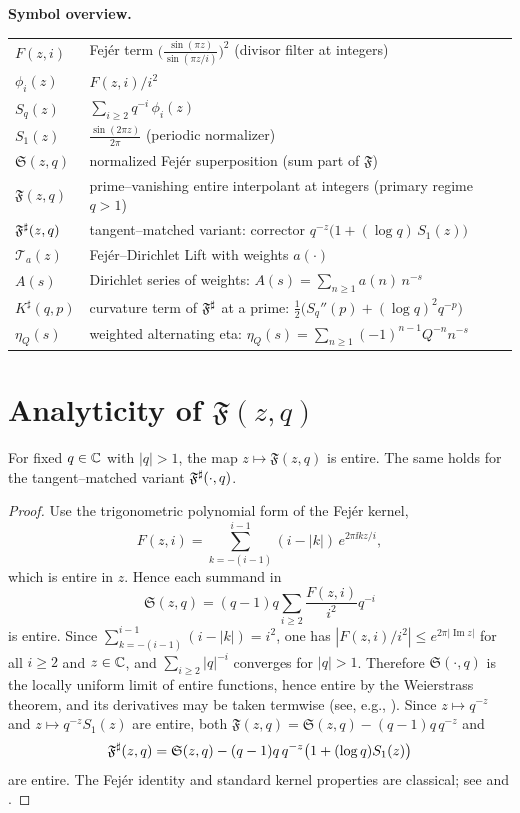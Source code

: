 \medskip
\noindent\textbf{Symbol overview.}\label{app:symbols}
\begin{center}
\begin{tabular}{@{}ll@{}}
$F(z,i)$ & Fej\'er term $\displaystyle \Big(\frac{\sin(\pi z)}{\sin(\pi z/i)}\Big)^{\!2}$ (divisor filter at integers) \\
$\phi_i(z)$ & $\displaystyle F(z,i)/i^2$ \\
$S_q(z)$ & $\displaystyle \sum_{i\ge2} q^{-i}\,\phi_i(z)$ \\
$S_1(z)$ & $\displaystyle \frac{\sin(2\pi z)}{2\pi}$ (periodic normalizer) \\
$\mathfrak S(z,q)$ & normalized Fej\'er superposition (sum part of $\mathfrak F$) \\
$\mathfrak F(z,q)$ & prime–vanishing entire interpolant at integers (primary regime $q>1$) \\
$\mathfrak F^{\sharp}(z,q)$ & tangent–matched variant: corrector $q^{-z}\bigl(1+(\log q)\,S_1(z)\bigr)$ \\
$\mathcal{T}_a(z)$ & Fej\'er–Dirichlet Lift with weights $a(\cdot)$ \\
$A(s)$ & Dirichlet series of weights: $\displaystyle A(s)=\sum_{n\ge1} a(n)\,n^{-s}$ \\
$K^\sharp(q,p)$ & curvature term of $\mathfrak F^{\sharp}$ at a prime: $\tfrac12\big(S_q''(p)+(\log q)^2q^{-p}\big)$ \\
$\eta_Q(s)$ & weighted alternating eta: $\displaystyle \eta_Q(s)=\sum_{n\ge1}(-1)^{n-1}Q^{-n}n^{-s}$ \\
\end{tabular}
\end{center}

\section{Analyticity of $\mathfrak F(z,q)$}\label{app:analyticity}

\begin{proposition}
For fixed $q\in\mathbb{C}$ with $|q|>1$, the map $z\mapsto\mathfrak F(z,q)$ is entire. The same holds for the tangent–matched variant $\mathfrak F^{\sharp}(\cdot,q)$.
\end{proposition}

\begin{proof}
Use the trigonometric polynomial form of the Fejér kernel,
\[
F(z,i)=\sum_{k=-(i-1)}^{i-1}(i-|k|)\,e^{2\pi\ii k z/i},
\]
which is entire in $z$. Hence each summand in
\[
\mathfrak S(z,q)=(q-1)q\sum_{i\ge2}\frac{F(z,i)}{i^2}q^{-i}
\]
is entire. Since $\sum_{k=-(i-1)}^{i-1}(i-|k|)=i^2$, one has $|F(z,i)/i^2|\le e^{2\pi|\operatorname{Im}z|}$ for all $i\ge2$ and $z\in\mathbb{C}$, and $\sum_{i\ge2}|q|^{-i}$ converges for $|q|>1$. Therefore $\mathfrak S(\cdot,q)$ is the locally uniform limit of entire functions, hence entire by the Weierstrass theorem, and its derivatives may be taken termwise (see, e.g., \cite{ahlfors1979}). Since $z\mapsto q^{-z}$ and $z\mapsto q^{-z}S_1(z)$ are entire, both $\mathfrak F(z,q)=\mathfrak S(z,q)-(q-1)q\,q^{-z}$ and
\[
\mathfrak F^{\sharp}(z,q)=\mathfrak S(z,q)-(q-1)q\,q^{-z}\bigl(1+(\log q)S_1(z)\bigr)
\]
are entire. The Fejér identity and standard kernel properties are classical; see \cite[Ch.~I]{katznelson2004} and \cite{zygmund2002}.
\end{proof}


